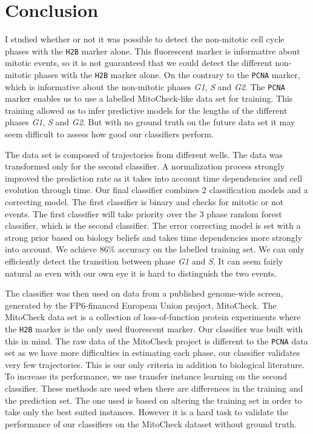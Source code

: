 \documentclass{article}
\begin{document}
\clearpage

\section{Conclusion}

I studied whether or not it was possible to detect the non-mitotic cell cycle phases with the \texttt{H2B} marker alone. This fluorescent marker is informative about mitotic events, so it is not guaranteed that we could detect the different non-mitotic phases with the \texttt{H2B} marker alone. On the contrary to the \texttt{PCNA} marker, which is informative about the non-mitotic phases \textit{G1}, \textit{S} and \textit{G2}. The \texttt{PCNA} marker enables us to use a labelled MitoCheck-like data set for training. This training allowed us to infer predictive models for the lengths of the different phases \textit{G1}, \textit{S} and \textit{G2}. But with no ground truth on the future data set it may seem difficult to assess how good our classifiers perform.

\bigskip

The data set is composed of trajectories from different wells. The data was transformed only for the second classifier. A normalization process strongly improved the prediction rate as it takes into account time dependencies and cell evolution through time. Our final classifier combines 2 classification models and a correcting model. The first classifier is binary and checks for mitotic or not events. The first classifier will take priority over the 3 phase random forest classifier, which is the second classifier. The error correcting model is set with a strong prior based on biology beliefs and takes time dependencies more strongly into account. We achieve 86\% accuracy on the labelled training set. We can only efficiently detect the transition between phase \textit{G1} and \textit{S}. It can seem fairly natural as even with our own eye it is hard to distinguish the two events. 

\bigskip

The classifier was then used on data from a published genome-wide screen, generated by the FP6-financed European Union project, MitoCheck. The MitoCheck data set is a collection of loss-of-function protein experiments where the \texttt{H2B} marker is the only used fluorescent marker. Our classifier was built with this in mind. The raw data of the MitoCheck project is different to the \texttt{PCNA} data set as we have more difficulties in estimating each phase, our classifier validates very few trajectories. This is our only criteria in addition to biological literature. To increase its performance, we use transfer instance learning on the second classifier. These methods are used when there are differences in the training and the prediction set. The one used is based on altering the training set in order to take only the best suited instances. However it is a hard task to validate the performance of our classifiers on the MitoCheck dataset without ground truth.
\end{document}
